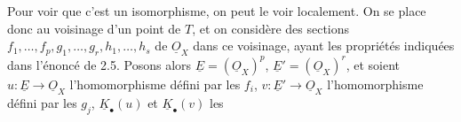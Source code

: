 Pour voir que c'est un isomorphisme, on peut le voir localement. On se place donc au voisinage d'un point de \(T\), et on considère des sections \(f_1,\ldots,f_p,g_1,\ldots,g_r,h_1,\ldots,h_s\) de \(\underline{O}_X\) dans ce voisinage, ayant les propriétés indiquées dans l'énoncé de 2.5. Posons alors \(\underline{E}=(\underline{O}_X)^p\), \(\underline{E}'=(\underline{O}_X)^r\), et soient \(u:\underline{E}\to\underline{O}_X\) l'homomorphisme défini par les \(f_i\), \(v:\underline{E}'\to\underline{O}_X\) l'homomorphisme défini par les \(g_j\), \(\underline{K}_\bullet(u)\) et \(\underline{K}_\bullet(v)\) les
